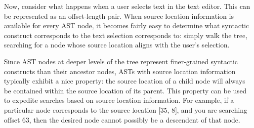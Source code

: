 \documentclass[prodmode]{acmlarge}
\newcommand{\code}[1]{\texttt{#1}}
\begin{document}
Now, consider what happens when a user selects text in the text editor.  This
can be represented as an offset-length pair.  When source location information
is available for every AST node, it becomes fairly easy to determine what
syntactic construct corresponds to the text selection corresponds to: simply
walk the tree, searching for a node whose source location aligns with the
user's selection.

Since AST nodes at deeper levels of the tree represent finer-grained syntactic
constructs than their ancestor nodes, ASTs with source location information
typically exhibit a nice property: the source location of a child node will
always be contained within the source location of its parent.  This property
can be used to expedite searches based on source location information.  For
example, if a particular node corresponds to the source location [35, 8], and
you are searching offset 63, then the desired node cannot possibly be a
descendent of that node.

%
%

\end{document}
